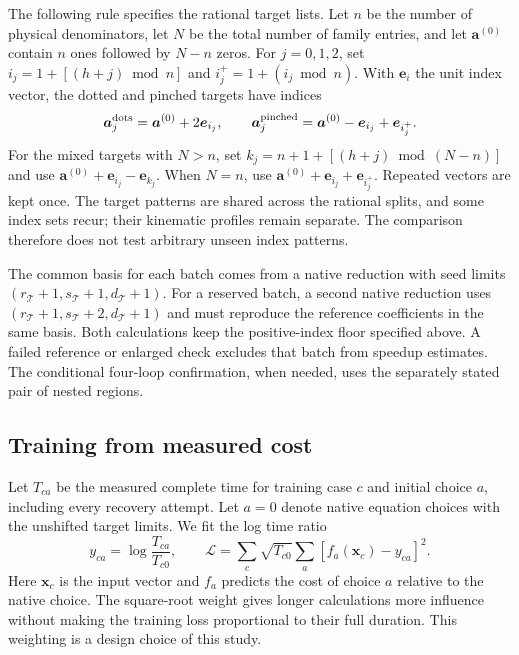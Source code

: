 The following rule specifies the rational target lists. Let $n$ be the number of physical denominators, let $N$ be the total number of family entries, and let $\boldsymbol a^{(0)}$ contain $n$ ones followed by $N-n$ zeros. For $j=0,1,2$, set $i_j=1+[(h+j)\bmod n]$ and $i_j^+=1+(i_j\bmod n)$. With $\boldsymbol e_i$ the unit index vector, the dotted and pinched targets have indices
\begin{equation}
 \boldsymbol a^{\rm dots}_j=\boldsymbol a^{(0)}+2\boldsymbol e_{i_j},\qquad
 \boldsymbol a^{\rm pinched}_j=\boldsymbol a^{(0)}-\boldsymbol e_{i_j}+\boldsymbol e_{i_j^+}.
 \label{eq:adaptive-targets}
\end{equation}
For the mixed targets with $N>n$, set $k_j=n+1+[(h+j)\bmod(N-n)]$ and use $\boldsymbol a^{(0)}+\boldsymbol e_{i_j}-\boldsymbol e_{k_j}$. When $N=n$, use $\boldsymbol a^{(0)}+\boldsymbol e_{i_j}+\boldsymbol e_{i_j^+}$. Repeated vectors are kept once. The target patterns are shared across the rational splits, and some index sets recur; their kinematic profiles remain separate. The comparison therefore does not test arbitrary unseen index patterns.

The common basis for each batch comes from a native reduction with seed limits $(r_{\mathcal{T}}+1,s_{\mathcal{T}}+1,d_{\mathcal{T}}+1)$. For a reserved batch, a second native reduction uses $(r_{\mathcal{T}}+1,s_{\mathcal{T}}+2,d_{\mathcal{T}}+1)$ and must reproduce the reference coefficients in the same basis. Both calculations keep the positive-index floor specified above. A failed reference or enlarged check excludes that batch from speedup estimates. The conditional four-loop confirmation, when needed, uses the separately stated pair of nested regions.

\subsection{Training from measured cost}
Let $T_{ca}$ be the measured complete time for training case $c$ and initial choice $a$, including every recovery attempt. Let $a=0$ denote native equation choices with the unshifted target limits. We fit the log time ratio
\begin{equation}
 y_{ca}=\log\frac{T_{ca}}{T_{c0}},\qquad
 \mathcal L=\sum_c \sqrt{T_{c0}}\sum_a
       \left[f_a(\boldsymbol x_c)-y_{ca}\right]^2.
 \label{eq:adaptive-loss}
\end{equation}
Here $\boldsymbol x_c$ is the input vector and $f_a$ predicts the cost of choice $a$ relative to the native choice. The square-root weight gives longer calculations more influence without making the training loss proportional to their full duration. This weighting is a design choice of this study.

